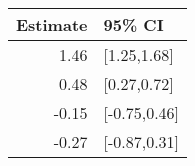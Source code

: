 \begin{tabular}{rl}
  \hline
Estimate & 95\% CI \\ 
  \hline
1.46 & [1.25,1.68] \\ 
  0.48 & [0.27,0.72] \\ 
  -0.15 & [-0.75,0.46] \\ 
  -0.27 & [-0.87,0.31] \\ 
   \hline
\end{tabular}

